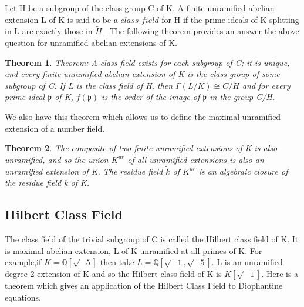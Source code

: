 \documentclass[preprint,12pt,reqno]{elsarticle}
\newtheorem{theorem}{Theorem}
\begin{document}
\newline
Let H be a subgroup of the class group C of K. A finite unramified abelian extension L of K is said to be a $\textit{class field}$ for H if the prime ideals of K splitting in L are exactly those in $\tilde{H}$ . The following theorem provides an answer the above question for unramified abelian extensions of K.
\begin{theorem}
Theorem: A class field exists for each subgroup of C; it is unique, and every finite unramified abelian extension of K is the class group of some subgroup of C. If L is the class field of H, then $\Gamma(L/K)\cong C/H$ and for every prime ideal $\mathfrak{p}$ of K, $f(\mathfrak{p})$ is the order of the image of $\mathfrak{p}$ in the group C/H.
\end{theorem}
We also have this theorem which allows us to define the maximal unramified extension of a number field. 
\begin{theorem}
The composite of two finite unramified extensions of K is also unramified, and so the union $K^{ur}$ of all unramified extensions is also an unramified extension of K. The residue field $\tilde{k}$ of $K^{ur}$ is an algebraic closure of the residue field k of K.
\end{theorem}
\subsection{Hilbert Class Field}
The class field of the trivial subgroup of C is called the Hilbert class field of K. It is maximal abelian extension, L of K unramified at all primes of K.
\newline
For example,if $K=\mathbb{Q}[\sqrt{-5}]$ then take $L=\mathbb{Q}[\sqrt{-1},\sqrt{-5}]$. L is an unramified degree 2 extension of K and so the Hilbert class field of K is $K[\sqrt{-1}]$. Here is a theorem which gives an application of the Hilbert Class Field to Diophantine equations.
\newline
\end{document}
